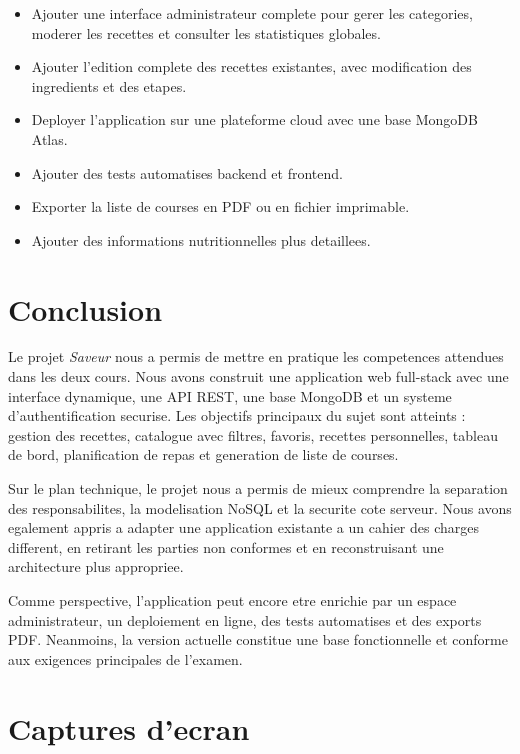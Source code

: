 \documentclass[12pt,a4paper]{report}
\begin{document}
\begin{itemize}[leftmargin=*]
  \item Ajouter une interface administrateur complete pour gerer les categories, moderer les recettes et consulter les statistiques globales.
  \item Ajouter l'edition complete des recettes existantes, avec modification des ingredients et des etapes.
  \item Deployer l'application sur une plateforme cloud avec une base MongoDB Atlas.
  \item Ajouter des tests automatises backend et frontend.
  \item Exporter la liste de courses en PDF ou en fichier imprimable.
  \item Ajouter des informations nutritionnelles plus detaillees.
\end{itemize}

\chapter{Conclusion}

Le projet \textit{Saveur} nous a permis de mettre en pratique les competences attendues dans les deux cours. Nous avons construit une application web full-stack avec une interface dynamique, une API REST, une base MongoDB et un systeme d'authentification securise. Les objectifs principaux du sujet sont atteints : gestion des recettes, catalogue avec filtres, favoris, recettes personnelles, tableau de bord, planification de repas et generation de liste de courses.

Sur le plan technique, le projet nous a permis de mieux comprendre la separation des responsabilites, la modelisation NoSQL et la securite cote serveur. Nous avons egalement appris a adapter une application existante a un cahier des charges different, en retirant les parties non conformes et en reconstruisant une architecture plus appropriee.

Comme perspective, l'application peut encore etre enrichie par un espace administrateur, un deploiement en ligne, des tests automatises et des exports PDF. Neanmoins, la version actuelle constitue une base fonctionnelle et conforme aux exigences principales de l'examen.

\appendix

\chapter{Captures d'ecran}
\end{document}
